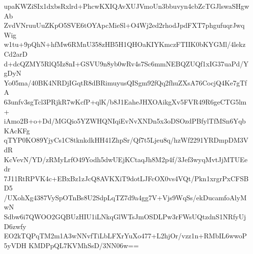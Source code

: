 upaKWZiSIx1dxbsRxlrd+PhcwKXIQAvXUJVmoUn3bbuvyn4cbZcTGJlswaSHgwAb
ZvdVNruuUuZKpO5SVE6tOYApcMieSl+O4Wj2ed2rhodJpdFXT7phgufuqrJwqWig
w1tu+9pQhN+hfMw6RMnU358zHB5H1QHOaKIYKmczFTIIK0bKYGMl/4lekzCd2arD
d+dcQZMY5RlQ5Iz8nI+GSVU9n8yb0wRv4s7Sc6mmNEBQZUQf1xIG37uaPd/YgDyN
Yo05ma/40BK4NRDjIGqtR8dBRimuyusQISgm92fQq2fhuZXsA76CocjQ4Ke7gTfA
63unfv3sgTcl3PRjkR7wKcfP+qlK/b8J1EaheJHXOAikgXv5FVR49R6geCTG5lm+
iAmo2B+o+Dd/MGQio5YZWHQNIqiEvNvXNDn5x3oDSOzdPBfylTfMSn6YqbKAcKFg
qTYP0KO89YjyCs1C8tknkdkHH41ZhpSr/Qf7t5Ljeu8q/hzWf2291YRDmpDM3VdR
KcVevN/YD/zRMyLrfO49Yodh5dwUEjKCtaqJh8M2p4f/3Jef3wyqMvtJjMTUEedr
7J11RtRPVK4c+EBxBz1zJcQ8AVKXiT9dotLJFcOX0vs4VQt/Pkn1xrgrPxCFSBD5
/UXohXg4387VySpOTnBs8U2SdpLqTZ7d9a4gg7V+Vjs9WqSs/ekDucamfoAlyMwN
Sdbw6i7QWOO2GQBUzHIU1iLNkqGlWTsJmOSDLPw3rFWsUQtzdnS1NRfyUjD6zwfy
EO2kTQPqTM2m1A3wNNvfTiLbLFXrYuXo477+L2hjOr/vzz1n+RMbIL6wwoP5yVDH
KMDPpQL7KVMhSsD/3NN06w==
